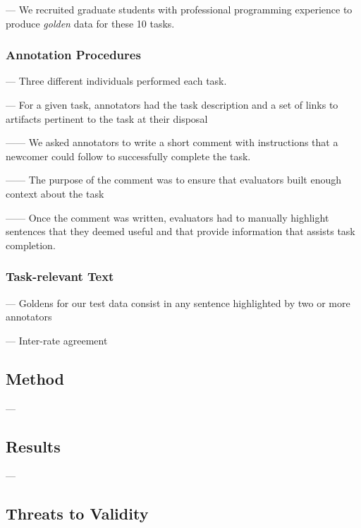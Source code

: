 --- We recruited  graduate students with professional programming experience to produce \textit{golden} data for these 10 tasks. \vspace{3mm}


\subsubsection{Annotation Procedures}

--- Three different individuals performed each task. \vspace{3mm}


--- For a given task, annotators had the task description and a set of links to artifacts 
pertinent to the task at their disposal \vspace{3mm}

------ We asked annotators to write a short comment with instructions that a newcomer could follow to successfully complete the task.

------ The purpose of the comment was to ensure that evaluators built enough context about the task 

------ Once the comment was written,  evaluators had to manually highlight sentences that they deemed useful and that provide information that assists task completion.

\subsubsection{Task-relevant Text}

--- Goldens for our test data consist in any sentence highlighted by two or more annotators \vspace{3mm}

--- Inter-rate agreement \vspace{3mm}


\subsection{Method}

---  \vspace{3mm}

\subsection{Results}

---  \vspace{3mm}

\subsection{Threats to Validity}

